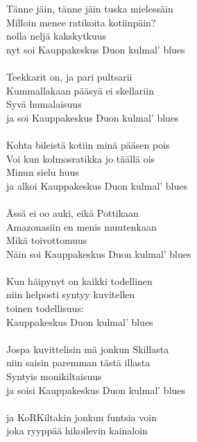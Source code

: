 
Tänne jäin, tänne jäin tuska mielessäin \\
Milloin menee ratikoita kotiinpäin? \\
nolla neljä kakskytkuus \\
nyt soi Kauppakeskus Duon kulmal' blues \\
\hspace{10mm} \\
Teekkarit on, ja pari pultsarii \\
Kummallakaan pääsyä ei skellariin \\
Syvä humalaisuus \\
ja soi Kauppakeskus Duon kulmal' blues \\
\hspace{10mm} \\
Kohta bileistä kotiin minä pääsen pois \\
Voi kun kolmosratikka jo täällä ois \\
Minun sielu huus \\
ja alkoi Kauppakeskus Duon kulmal' blues \\
\hspace{10mm} \\
Ässä ei oo auki, eikä Pottikaan \\
Amazonasiin en menis muutenkaan \\
Mikä toivottomuus \\
Näin soi Kauppakeskus Duon kulmal' blues \\
\hspace{10mm} \\
Kun häipynyt on kaikki todellinen \\
niin helposti syntyy kuvitellen \\
toinen todellisuus: \\
Kauppakeskus Duon kulmal' blues \\
\hspace{10mm} \\
Jospa kuvittelisin mä jonkun Skillasta \\
niin saisin paremman tästä illasta \\
Syntyis monikiltaisuus \\
ja soisi Kauppakeskus Duon kulmal' blues \\
\hspace{10mm} \\
ja KoRKiltakin jonkun funtsia voin \\
joka ryyppää hikoilevin kainaloin \\
